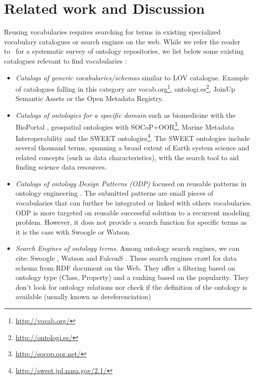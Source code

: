 \documentclass{iosart2c}
\begin{document}
\section{Related work and Discussion}
\label{sec:related}

Reusing vocabularies requires searching for terms in existing specialized vocabulary catalogues or search engines on the web. While we refer the reader to~\cite{AquinJoWS12} for a systematic survey of ontology repositories, we list below some existing catalogues relevant to find vocabularies \cite{wasabi13}:
\begin{itemize}
 \item \textit{Catalogs of generic vocabularies/schemas} similar to LOV catalogue. Example of catalogues falling in this category are vocab.org\footnote{\url{http://vocab.org/}}, ontologi.es\footnote{\url{http://ontologi.es/}}, JoinUp Semantic Assets or the Open Metadata Registry.
 \item \textit{Catalogs of ontologies for a specific domain} such as biomedicine with the BioPortal \cite{bioportal11}, geospatial ontologies with SOCoP+OOR\footnote{\url{http://socop.oor.net/}}, Marine Metadata Interoperability and the SWEET \cite{sweet05} ontologies\footnote{\url{http://sweet.jpl.nasa.gov/2.1/}}. The SWEET ontologies include several thousand terms, spanning a broad extent of Earth system science and related concepts (such as data characteristics), with the search tool to aid finding science data resources. 
 \item \textit{Catalogs of ontology Design Patterns (ODP)} focused on reusable patterns in ontology engineering \cite{presutti08}. The submitted patterns are small pieces of vocabularies that can further be integrated or linked with others vocabularies. ODP is more targeted on  reusable successful solution to a recurrent modeling problem. However, it does not provide a search function for specific terms as it is the case with Swoogle or Watson.
 \item \textit{Search Engines of ontology terms}. Among ontology search engines, we can cite: Swoogle \cite{finin2005swoogle}, Watson \cite{d2007watson,Sabou07} and FalconS \cite{cheng2008falcons}. These search engines crawl for data schema from RDF document on the Web. They offer a filtering based on ontology type (Class, Property) and a ranking based on the popularity. They don't look for ontology relations nor check if the definition of the ontology is available (usually known as dereferenciation)
\end{itemize}
\end{document}
